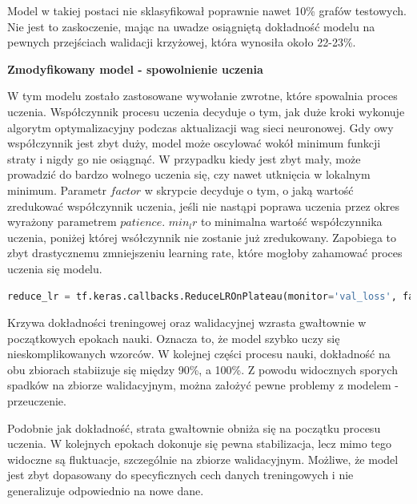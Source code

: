 Model w takiej postaci nie sklasyfikował poprawnie nawet 10\% grafów testowych.
Nie jest to zaskoczenie, mając na uwadze osiągniętą dokładność modelu na pewnych przejściach walidacji krzyżowej,
która wynosiła około 22-23\%.

\textbf{Zmodyfikowany model - spowolnienie uczenia}

W tym modelu zostało zastosowane wywołanie zwrotne, które spowalnia proces uczenia.
Współczynnik procesu uczenia decyduje o tym, jak duże kroki wykonuje algorytm optymalizacyjny podczas aktualizacji wag sieci neuronowej.
Gdy owy współczynnik jest zbyt duży, model może oscylować wokół minimum funkcji straty i nigdy go nie osiągnąć.
W przypadku kiedy jest zbyt mały, może prowadzić do bardzo wolnego uczenia się, czy nawet utknięcia w lokalnym minimum.
Parametr $factor$ w skrypcie decyduje o tym, o jaką wartość zredukować współczynnik uczenia,
jeśli nie nastąpi poprawa uczenia przez okres wyrażony parametrem $patience$.
$min_lr$ to minimalna wartość współczynnika uczenia, poniżej której wsółczynnik nie zostanie już zredukowany.
Zapobiega to zbyt drastycznemu zmniejszeniu learning rate, które mogłoby zahamować proces uczenia się modelu.

\begin{lstlisting}[language=Python,caption=Listing zmodyfikowanego skryptu
	znajdującego się bezpośrdenio po tworzeniu modelu z walidacją krzyżową - wersja 4,label={tests-model-crossval4}]
	reduce_lr = tf.keras.callbacks.ReduceLROnPlateau(monitor='val_loss', factor=0.2, patience=5, min_lr=0.001)
\end{lstlisting}

Krzywa dokładności treningowej oraz walidacyjnej wzrasta gwałtownie w początkowych epokach nauki.
Oznacza to, że model szybko uczy się nieskomplikowanych wzorców.
W kolejnej części procesu nauki, dokładność na obu zbiorach stabiizuje się między 90\%, a 100\%.
Z powodu widocznych sporych spadków na zbiorze walidacyjnym, można założyć pewne problemy z modelem - przeuczenie.

Podobnie jak dokładność, strata gwałtownie obniża się na początku procesu uczenia.
W kolejnych epokach dokonuje się pewna stabilizacja, lecz mimo tego widoczne są fluktuacje, szczególnie na zbiorze walidacyjnym.
Możliwe, że model jest zbyt dopasowany do specyficznych cech danych treningowych i nie generalizuje odpowiednio na nowe dane.

